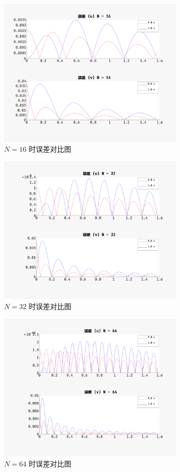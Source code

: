 \documentclass{article}
\begin{document}
		\begin{figure}[htbp]
			\centering
			\includegraphics[width=0.8\textwidth]{figure/error_16.png}
			\caption{$N=16$ 时误差对比图}
		\end{figure}

		\begin{figure}[htbp]
			\centering
			\includegraphics[width=0.8\textwidth]{figure/error_32.png}
			\caption{$N=32$ 时误差对比图}
		\end{figure}

		\begin{figure}[htbp]
			\centering
			\includegraphics[width=0.8\textwidth]{figure/error_64.png}
			\caption{$N=64$ 时误差对比图}
		\end{figure}
\end{document}
